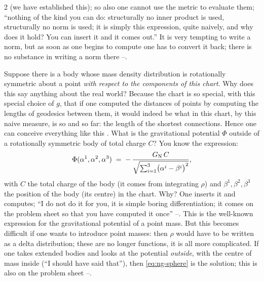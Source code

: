 \begin{paracol}{2}
(we have established this); so also one cannot use the metric to evaluate them; ``nothing of the kind you can do: structurally no inner product is used, structurally no norm is used; it is simply this expression, quite naively, and why does it hold? You can insert it and it comes out.'' It is very tempting to write a norm, but as soon as one begins to compute one has to convert it back; there is no substance in writing a norm there --.

\begin{example}\label{ex:ng-sphere}
Suppose there is a body whose mass density distribution is rotationally symmetric about a point \emph{with respect to the components of this chart}. Why does this say anything about the real world? Because the chart is so special, with this special choice of $g$, that if one computed the distances of points by computing the lengths of geodesics between them, it would indeed be what in this chart, by this naive measure, is so and so far:
the length of the shortest connections. Hence one can conceive everything like this . What is the gravitational potential $\Phi$ outside of a rotationally symmetric body of total charge $C$? You know the expression:
\begin{equation}\label{eq:ng-sphere}
  \Phi(\alpha^1,\alpha^2,\alpha^3)\;=\;-\,\frac{G_{\rm N}\,C}{\sqrt{\sum_{i=1}^3\bigl(\alpha^i-\beta^i\bigr)^2}} ,
\end{equation}
with $C$ the total charge of the body (it comes from integrating $\rho$) and $\beta^1,\beta^2,\beta^3$ the position of the body (its centre) in the chart. Why? One inserts it and computes; ``I do not do it for you, it is simple boring differentiation; it comes on the problem sheet so that you have computed it once'' --.
This is the well-known expression for the gravitational potential of a point mass. But this becomes difficult if one wants to introduce point masses: then $\rho$ would have to be written as a delta distribution; these are no longer functions, it is all more complicated. If one takes extended bodies and looks at the potential \emph{outside}, with the centre of mass inside (``I should have said that''), then \eqref{eq:ng-sphere} is the solution; this is also on the problem sheet --.
\end{example}
\begin{coursenote}

\end{coursenote}
\end{paracol}
